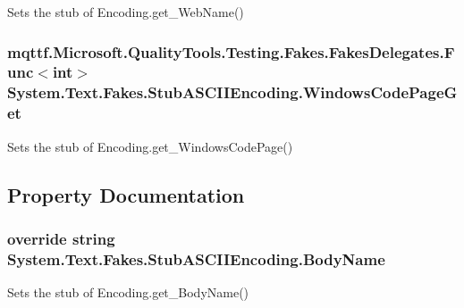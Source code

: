 Sets the stub of Encoding.\-get\-\_\-\-Web\-Name()

\hypertarget{class_system_1_1_text_1_1_fakes_1_1_stub_a_s_c_i_i_encoding_a0a3ca0c97703dfb4527f88d6cd12c9e7}{
\subsubsection[{Windows\-Code\-Page\-Get}]{\setlength{\rightskip}{0pt plus 5cm}mqttf.\-Microsoft.\-Quality\-Tools.\-Testing.\-Fakes.\-Fakes\-Delegates.\-Func$<$int$>$ System.\-Text.\-Fakes.\-Stub\-A\-S\-C\-I\-I\-Encoding.\-Windows\-Code\-Page\-Get}}\label{class_system_1_1_text_1_1_fakes_1_1_stub_a_s_c_i_i_encoding_a0a3ca0c97703dfb4527f88d6cd12c9e7}


Sets the stub of Encoding.\-get\-\_\-\-Windows\-Code\-Page()



\subsection{Property Documentation}
\hypertarget{class_system_1_1_text_1_1_fakes_1_1_stub_a_s_c_i_i_encoding_ab6312104bdb0fc02edf3e76556a6baae}{
\subsubsection[{Body\-Name}]{\setlength{\rightskip}{0pt plus 5cm}override string System.\-Text.\-Fakes.\-Stub\-A\-S\-C\-I\-I\-Encoding.\-Body\-Name\hspace{0.3cm}{\ttfamily [get]}}}\label{class_system_1_1_text_1_1_fakes_1_1_stub_a_s_c_i_i_encoding_ab6312104bdb0fc02edf3e76556a6baae}


Sets the stub of Encoding.\-get\-\_\-\-Body\-Name()

